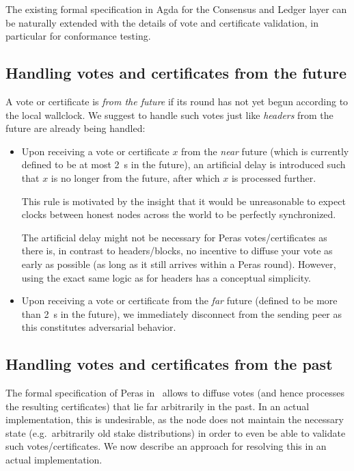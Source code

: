 The existing formal specification in Agda for the Consensus and Ledger layer \parencite{consensus-spec,cardano-formal-ledger-specs} can be naturally extended with the details of vote and certificate validation, in particular for conformance testing.

\subsection{Handling votes and certificates from the future}\label{sec:votes certs from the future}

A vote or certificate is \emph{from the future} if its round has not yet begun according to the local wallclock.
We suggest to handle such votes just like \emph{headers} from the future are already being handled:
\begin{itemize}
\item
  Upon receiving a vote or certificate $x$ from the \emph{near} future (which is currently defined to be at most \qty{2}{\s} in the future), an artificial delay is introduced such that $x$ is no longer from the future, after which $x$ is processed further.

  This rule is motivated by the insight that it would be unreasonable to expect clocks between honest nodes across the world to be perfectly synchronized.

  The artificial delay might not be necessary for Peras votes/certificates as there is, in contrast to headers/blocks, no incentive to diffuse your vote as early as possible (as long as it still arrives within a Peras round).
  However, using the exact same logic as for headers has a conceptual simplicity.
\item
  Upon receiving a vote or certificate from the \emph{far} future (defined to be more than \qty{2}{\s} in the future), we immediately disconnect from the sending peer as this constitutes adversarial behavior.
\end{itemize}

\subsection{Handling votes and certificates from the past}\label{sec:votes certs from the past}

The formal specification of Peras in~\cite{peras-cip} allows to diffuse votes (and hence processes the resulting certificates) that lie far arbitrarily in the past.
In an actual implementation, this is undesirable, as the node does not maintain the necessary state (e.g.\ arbitrarily old stake distributions) in order to even be able to validate such votes/certificates.
We now describe an approach for resolving this in an actual implementation.

